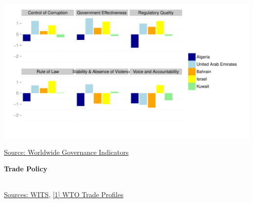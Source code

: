 \documentclass{article}\usepackage[]{graphicx}\usepackage[]{color}
\makeatletter
\def\maxwidth{ %
  \ifdim\Gin@nat@width>\linewidth
    \linewidth
  \else
    \Gin@nat@width
  \fi
}
\makeatother
\begin{document}
\begin{minipage}[b]{0.99\textwidth}
  \begin{minipage}[c]{0.50\textwidth} %
    \vspace*{0.8cm}
    \vspace*{0.3cm}


{\centering \includegraphics[width=\maxwidth]{figure/WGIindicators-1} 

}



    \vspace*{-0.6cm} 
    \hspace*{0.3cm} \raggedright\footnotesize{\href{http://data.worldbank.org/data-catalog/worldwide-governance-indicators}{Source: Worldwide Governance Indicators}}
  \end{minipage}
  \begin{minipage}[c]{0.48\textwidth} %
    \vspace*{0.4cm}
    {\color{blue!50!black} \textbf{Trade Policy}}
    \\[20pt]
    \centering
    \\[20pt]
    \raggedright{\footnotesize{\href{http://wits.worldbank.org}{Sources: WITS}{, }\href{http://stat.wto.org/CountryProfile/WSDBCountryPFHome.aspx?Language=E}{[1] WTO Trade Profiles}}}
  \end{minipage}
\end{minipage}
\end{document}
